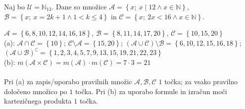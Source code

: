 \documentclass[addpoints]{exam}
\begin{document}
\begin{questions}
    \newpage

    \question
    Naj bo $\mathcal{U}=\mathbb{N}_{13}$. Dane so množice $\mathcal{A}=\left\{x;\ x\mid 12 \land x\in\mathbb{N}\right\}$, $\mathcal{B}=\left\{x;\ x=2k+1 \land 1< k\leq 4\right\}$ in $\mathcal{C}=\left\{x;\ 2x<16 \land x\in\mathbb{N}\right\}$. 

    \begin{solution}[14cm]
        $\mathcal{A}=\left\{6,8,10,12,14,16,18\right\}$, $\mathcal{B}=\left\{8,11,14,17,20\right\}$, $\mathcal{C}=\left\{10,15,20\right\}$ \\
        (a): $\mathcal{A}\cap\mathcal{C}=\left\{10\right\}$; $\mathcal{C}\setminus\mathcal{A}=\left\{15,20\right\}$; $(\mathcal{A}\cup\mathcal{C})\setminus\mathcal{B}=\left\{6,10,12,15,16,18\right\}$; $(\mathcal{A}\cup\mathcal{B})^\complement=\left\{1,2,3,4,5,7,9,13,15,19,21,22,23\right\}$ \\
        (b): $m(\mathcal{A}\times\mathcal{C})=m(\mathcal{A})\cdot m(\mathcal{C})=7\cdot 3 = 21$ \\ \\
        Pri (a) za zapis/uporabo pravilnih množic $\mathcal{A}, \mathcal{B}, \mathcal{C}$ $1$ točka; za vsako pravilno določeno množico po $1$ točka. Pri (b) za uporabo formule in izračun moči kartezičnega produkta $1$ točka.
    \end{solution}



\end{questions}
\end{document}
